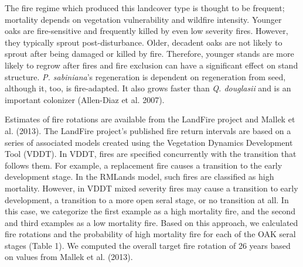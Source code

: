 The fire regime which produced this landcover type is thought to be frequent; mortality depends on vegetation vulnerability and wildfire intensity. Younger oaks are fire-sensitive and frequently killed by even low severity fires. However, they typically sprout post-disturbance. Older, decadent oaks are not likely to sprout after being damaged or killed by fire. Therefore, younger stands are more likely to regrow after fires and fire exclusion can have a significant effect on stand structure. \emph{P. sabiniana}’s regeneration is dependent on regeneration from seed, although it, too, is fire-adapted. It also grows faster than \emph{Q. douglasii} and is an important colonizer (Allen-Diaz et al. 2007). 

Estimates of fire rotations are available from the LandFire project and Mallek et al. (2013). The LandFire project’s published fire return intervals are based on a series of associated models created using the Vegetation Dynamics Development Tool (VDDT). In VDDT, fires are specified concurrently with the transition that follows them. For example, a replacement fire causes a transition to the early development stage. In the RMLands model, such fires are classified as high mortality. However, in VDDT mixed severity fires may cause a transition to early development, a transition to a more open seral stage, or no transition at all. In this case, we categorize the first example as a high mortality fire, and the second and third examples as a low mortality fire. Based on this approach, we calculated fire rotations and the probability of high mortality fire for each of the OAK seral stages (Table 1). We computed the overall target fire rotation of 26 years based on values from Mallek et al. (2013). 




